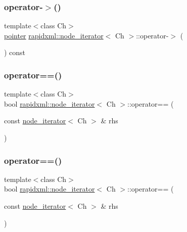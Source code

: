 \subsubsection{\texorpdfstring{operator-\/$>$()}{operator->()}\hspace{0.1cm}{\footnotesize\ttfamily [2/2]}}
{\footnotesize\ttfamily template$<$class Ch$>$ \\
\mbox{\hyperlink{classrapidxml_1_1node__iterator_a65dca8bca2b9c29f635b9ad0bdeeecb9}{pointer}} \mbox{\hyperlink{classrapidxml_1_1node__iterator}{rapidxml\+::node\+\_\+iterator}}$<$ Ch $>$\+::operator-\/$>$ (\begin{DoxyParamCaption}{ }\end{DoxyParamCaption}) const\hspace{0.3cm}{\ttfamily [inline]}}

\mbox{\label{classrapidxml_1_1node__iterator_a5cb8a3b0d65a1a2517995e986a4debfd}} 
\subsubsection{\texorpdfstring{operator==()}{operator==()}\hspace{0.1cm}{\footnotesize\ttfamily [1/2]}}
{\footnotesize\ttfamily template$<$class Ch$>$ \\
bool \mbox{\hyperlink{classrapidxml_1_1node__iterator}{rapidxml\+::node\+\_\+iterator}}$<$ Ch $>$\+::operator== (\begin{DoxyParamCaption}\item[{const \mbox{\hyperlink{classrapidxml_1_1node__iterator}{node\+\_\+iterator}}$<$ Ch $>$ \&}]{rhs }\end{DoxyParamCaption})\hspace{0.3cm}{\ttfamily [inline]}}

\mbox{\label{classrapidxml_1_1node__iterator_a5cb8a3b0d65a1a2517995e986a4debfd}} 
\subsubsection{\texorpdfstring{operator==()}{operator==()}\hspace{0.1cm}{\footnotesize\ttfamily [2/2]}}
{\footnotesize\ttfamily template$<$class Ch$>$ \\
bool \mbox{\hyperlink{classrapidxml_1_1node__iterator}{rapidxml\+::node\+\_\+iterator}}$<$ Ch $>$\+::operator== (\begin{DoxyParamCaption}\item[{const \mbox{\hyperlink{classrapidxml_1_1node__iterator}{node\+\_\+iterator}}$<$ Ch $>$ \&}]{rhs }\end{DoxyParamCaption})\hspace{0.3cm}{\ttfamily [inline]}}




